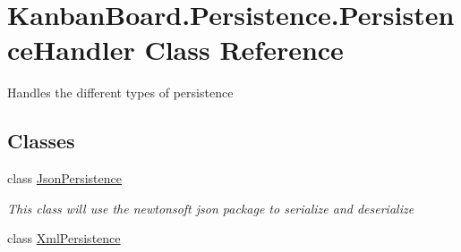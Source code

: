 \hypertarget{class_kanban_board_1_1_persistence_1_1_persistence_handler}{}\section{Kanban\+Board.\+Persistence.\+Persistence\+Handler Class Reference}
\label{class_kanban_board_1_1_persistence_1_1_persistence_handler}


Handles the different types of persistence  


\subsection*{Classes}
\begin{DoxyCompactItemize}
\item 
class \hyperlink{class_kanban_board_1_1_persistence_1_1_persistence_handler_1_1_json_persistence}{Json\+Persistence}
\begin{DoxyCompactList}\small\item\em This class will use the newtonsoft json package to serialize and deserialize \end{DoxyCompactList}\item 
class \hyperlink{class_kanban_board_1_1_persistence_1_1_persistence_handler_1_1_xml_persistence}{Xml\+Persistence}
\end{DoxyCompactItemize}
